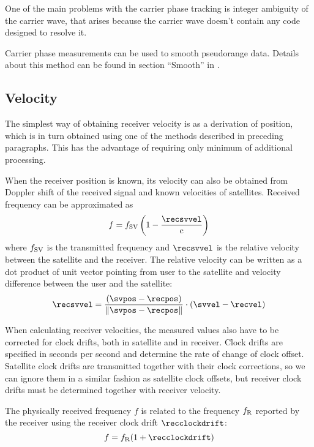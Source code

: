 One of the main problems with the carrier phase tracking is integer ambiguity of the carrier wave,
that arises because the carrier wave doesn't contain any code designed to resolve it.

Carrier phase measurements can be used to smooth pseudorange data.
Details about this method can be found in section \enquote{Smooth} in \cite{sam-www}.

\subsection{Velocity}
The simplest way of obtaining receiver velocity is as a derivation of
position, which is in turn obtained using one of the methods described in preceding paragraphs.
This has the advantage of requiring only minimum of additional processing.

When the receiver position is known, its velocity can also be obtained from Doppler shift of
the received signal and known velocities of satellites.
Received frequency can be approximated as
\begin{equation}
	f = f_\SV \left(1 - \frac{\recsvvel}{\speedoflight}\right)
	\label{eq:doppler}
\end{equation}
where \(f_{\mathrm{SV}}\) is the transmitted frequency and \(\recsvvel\) is the relative velocity
between the satellite and the receiver.
The relative velocity can be written as a dot product of unit vector pointing
from user to the satellite and velocity difference between the user and the satellite:
\begin{equation}
	\recsvvel = \frac{
		(\svpos - \recpos)
	}{
		\norm{\svpos - \recpos}
	} \cdot (\svvel - \recvel)
	\label{eq:doppler-velocity}
\end{equation}

When calculating receiver velocities, the measured values also have to be corrected for
clock drifts, both in satellite and in receiver.
Clock drifts are specified in seconds per second and determine the rate of change of clock offset.
Satellite clock drifts are transmitted together with their clock corrections, so we can ignore
them in a similar fashion as satellite clock offsets, but receiver clock drifts must be determined
together with receiver velocity.

The physically received frequency \(f\) is related to the frequency \(f_{\mathrm{R}}\) reported by the receiver
using the receiver clock drift \(\recclockdrift\):
\begin{equation}
	f = f_\REC ( 1 + \recclockdrift)
	\label{eq:doppler-clock-drift}
\end{equation}

